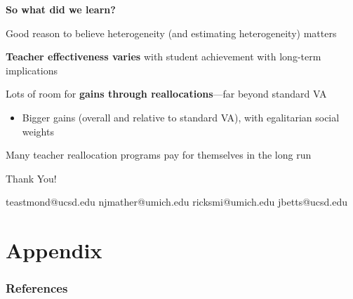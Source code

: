 \documentclass[t,aspectratio=169,11pt,presentation]{beamer}
\newenvironment{wideitemize}{\itemize\addtolength{\itemsep}{14pt}}{\enditemize}
\begin{document}
\begin{frame}{\textbf{So what did we learn?}}

\begin{wideitemize}
\item Good reason to believe heterogeneity (and estimating heterogeneity) matters
\item<2-> \textbf{Teacher effectiveness varies} with student achievement with long-term implications
\item<3-> Lots of room for \textbf{gains through reallocations}---far beyond standard VA
\begin{itemize}
    \item<4-> Bigger gains (overall and relative to standard VA), with egalitarian social weights
\end{itemize}
\item<5-> Many teacher reallocation programs pay for themselves in the long run
\end{wideitemize}

\end{frame}


\begin{frame}[c,noframenumbering]
\centering
\Huge{\centerline{Thank You!}}

\normalsize  teastmond@ucsd.edu \hspace{1em} njmather@umich.edu \hspace{1em} ricksmi@umich.edu \hspace{1em} jbetts@ucsd.edu

\end{frame}





\appendix
\section{Appendix}

\begin{frame}
\frametitle{References}
\tiny

\end{frame}
\end{document}
